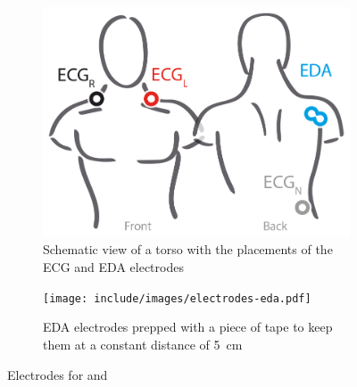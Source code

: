\begin{figure}[ht]
    \centering
    \begin{subfigure}[t]{0.49\textwidth}
        \centering
		\includegraphics[width=\textwidth]{include/images/electrodes.png}
		\caption{Schematic view of a torso with the placements of the \gls{ECG} and \gls{EDA} electrodes}
        \label{fig:electrodes-schema}
    \end{subfigure}
    \hfill
    \begin{subfigure}[t]{0.49\textwidth}  
        \centering 
		\texttt{[image: include/images/electrodes-eda.pdf]}
		\caption{\gls{EDA} electrodes prepped with a piece of tape to keep them at a constant distance of \SI{5}{\centi\meter}}
        \label{fig:electrodes-eda}
    \end{subfigure}
    \caption[Placement of electrodes]{Electrodes for  and }
    \label{fig:electrodes}
\end{figure}